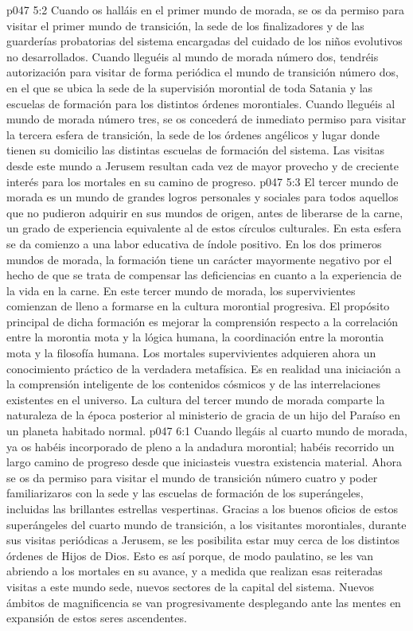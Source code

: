 \vs p047 5:2 Cuando os halláis en el primer mundo de morada, se os da permiso para visitar el primer mundo de transición, la sede de los finalizadores y de las guarderías probatorias del sistema encargadas del cuidado de los niños evolutivos no desarrollados. Cuando lleguéis al mundo de morada número dos, tendréis autorización para visitar de forma periódica el mundo de transición número dos, en el que se ubica la sede de la supervisión morontial de toda Satania y las escuelas de formación para los distintos órdenes morontiales. Cuando lleguéis al mundo de morada número tres, se os concederá de inmediato permiso para visitar la tercera esfera de transición, la sede de los órdenes angélicos y lugar donde tienen su domicilio las distintas escuelas de formación del sistema. Las visitas desde este mundo a Jerusem resultan cada vez de mayor provecho y de creciente interés para los mortales en su camino de progreso.
\vs p047 5:3 El tercer mundo de morada es un mundo de grandes logros personales y sociales para todos aquellos que no pudieron adquirir en sus mundos de origen, antes de liberarse de la carne, un grado de experiencia equivalente al de estos círculos culturales. En esta esfera se da comienzo a una labor educativa de índole positivo. En los dos primeros mundos de morada, la formación tiene un carácter mayormente negativo por el hecho de que se trata de compensar las deficiencias en cuanto a la experiencia de la vida en la carne. En este tercer mundo de morada, los supervivientes comienzan de lleno a formarse en la cultura morontial progresiva. El propósito principal de dicha formación es mejorar la comprensión respecto a la correlación entre la morontia mota y la lógica humana, la coordinación entre la morontia mota y la filosofía humana. Los mortales supervivientes adquieren ahora un conocimiento práctico de la verdadera metafísica. Es en realidad una iniciación a la comprensión inteligente de los contenidos cósmicos y de las interrelaciones existentes en el universo. La cultura del tercer mundo de morada comparte la naturaleza de la época posterior al ministerio de gracia de un hijo del Paraíso en un planeta habitado normal.
\vs p047 6:1 Cuando llegáis al cuarto mundo de morada, ya os habéis incorporado de pleno a la andadura morontial; habéis recorrido un largo camino de progreso desde que iniciasteis vuestra existencia material. Ahora se os da permiso para visitar el mundo de transición número cuatro y poder familiarizaros con la sede y las escuelas de formación de los superángeles, incluidas las brillantes estrellas vespertinas. Gracias a los buenos oficios de estos superángeles del cuarto mundo de transición, a los visitantes morontiales, durante sus visitas periódicas a Jerusem, se les posibilita estar muy cerca de los distintos órdenes de Hijos de Dios. Esto es así porque, de modo paulatino, se les van abriendo a los mortales en su avance, y a medida que realizan esas reiteradas visitas a este mundo sede, nuevos sectores de la capital del sistema. Nuevos ámbitos de magnificencia se van progresivamente desplegando ante las mentes en expansión de estos seres ascendentes.
